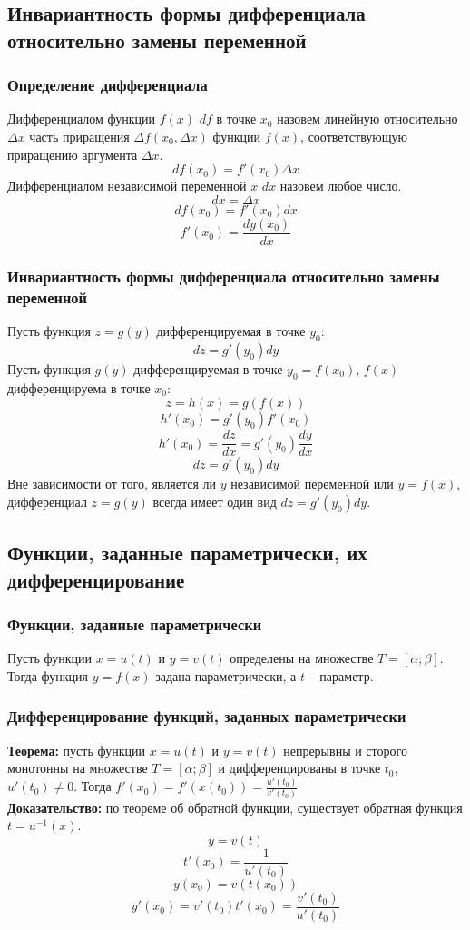 \documentclass{article}
\newcommand{\theorem}{\textbf{Теорема:} }
\newcommand{\proof}{\textbf{Доказательство:} }
\begin{document}
    \subsection*{Инвариантность формы дифференциала относительно замены переменной}
        \subsubsection*{Определение дифференциала}
        Дифференциалом функции $f(x)$ $df$ в точке $x_0$ назовем линейную относительно $\Delta x$ часть приращения $\Delta f(x_0, \Delta x)$ функции $f(x)$,
        соответствующую приращению аргумента $\Delta x$.
        \[ df (x_0) = f'(x_0) \Delta x \]
        Дифференциалом независимой переменной $x$ $dx$ назовем любое число.
        \[ dx = \Delta x \]
        \[ df (x_0) = f'(x_0) dx \]
        \[ f'(x_0) = \frac{dy(x_0)}{dx} \]
        
        \subsubsection*{Инвариантность формы дифференциала относительно замены переменной}
        Пусть функция $z = g(y)$ дифференцируемая в точке $y_0$:
        \[ dz = g'(y_0) dy \]
        Пусть функция $g(y)$ дифференцируемая в точке $y_0 = f(x_0)$, $f(x)$ дифференцируема в точке $x_0$:
        \[ z = h(x) = g(f(x)) \]
        \[ h'(x_0) = g'(y_0) f'(x_0) \]
        \[ h'(x_0) = \frac{dz}{dx} = g'(y_0) \frac{dy}{dx} \]
        \[ dz = g'(y_0) dy \]
        Вне зависимости от того, является ли $y$ независимой переменной или $y = f(x)$, дифференциал $z = g(y)$ всегда имеет один вид $dz = g'(y_0)dy$.


    \subsection*{Функции, заданные параметрически, их дифференцирование}
        \subsubsection*{Функции, заданные параметрически}
        Пусть функции $x = u(t)$ и $y = v(t)$ определены на множестве $T = [\alpha; \beta]$. Тогда функция $y = f(x)$ задана параметрически, а $t$ -- параметр.

        \subsubsection*{Дифференцирование функций, заданных параметрически}
        \theorem пусть функции $x = u(t)$ и $y = v(t)$ непрерывны и сторого монотонны на множестве $T = [\alpha; \beta]$ и дифференцированы в точке $t_0$, $u'(t_0) \neq 0$.
        Тогда $f'(x_0) = f'(x(t_0)) = \frac{u'(t_0)}{v'(t_0)}$
        \\
        \proof по теореме об обратной функции, существует обратная функция $t = u^{-1}(x)$.
        \[ y = v(t) \]
        \[ t'(x_0) = \frac{1}{u'(t_0)} \]
        \[ y(x_0) = v(t(x_0)) \]
        \[ y'(x_0) = v'(t_0) t'(x_0) = \frac{v'(t_0)}{u'(t_0)} \]
        
\end{document}
